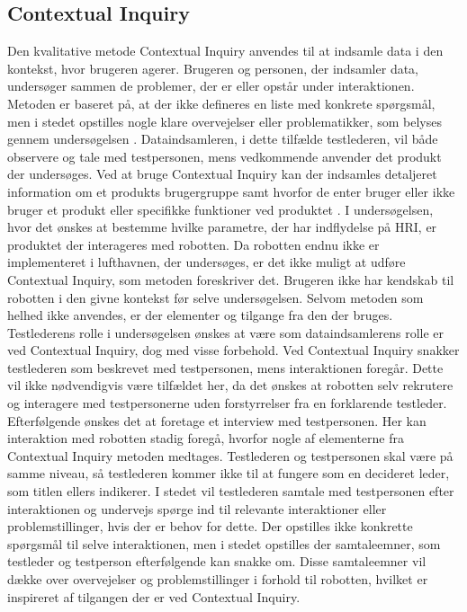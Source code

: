 \subsection{Contextual Inquiry}
\label{ParametreContextualInquiry}
%
Den kvalitative metode Contextual Inquiry anvendes til at indsamle data i den kontekst, hvor brugeren agerer. Brugeren og personen, der indsamler data, undersøger sammen de problemer, der er eller opstår under interaktionen. Metoden er baseret på, at der ikke defineres en liste med konkrete spørgsmål, men i stedet opstilles nogle klare overvejelser eller problematikker, som belyses gennem undersøgelsen \textcite[s. 1]{PDF:UsingCIToLearn}. Dataindsamleren, i dette tilfælde testlederen, vil både observere og tale med testpersonen, mens vedkommende anvender det produkt der undersøges. \blankline
%
Ved at bruge Contextual Inquiry kan der indsamles detaljeret information om et produkts brugergruppe samt hvorfor de enter bruger eller ikke bruger et produkt eller specifikke funktioner ved produktet \textcite[s. 2]{PDF:UsingCIToLearn}. \blankline
%
I undersøgelsen, hvor det ønskes at bestemme hvilke parametre, der har indflydelse på HRI, er produktet der interageres med robotten. Da robotten endnu ikke er implementeret i lufthavnen, der undersøges, er det ikke muligt at udføre Contextual Inquiry, som metoden foreskriver det. Brugeren ikke har kendskab til robotten i den givne kontekst før selve undersøgelsen. Selvom metoden som helhed ikke anvendes, er der elementer og tilgange fra den der bruges. \blankline
%
Testlederens rolle i undersøgelsen ønskes at være som dataindsamlerens rolle er ved Contextual Inquiry, dog med visse forbehold. Ved Contextual Inquiry snakker testlederen som beskrevet med testpersonen, mens interaktionen foregår. Dette vil ikke nødvendigvis være tilfældet her, da det ønskes at robotten selv rekrutere og interagere med testpersonerne uden forstyrrelser fra en forklarende testleder. Efterfølgende ønskes det at foretage et interview med testpersonen. Her kan interaktion med robotten stadig foregå, hvorfor nogle af elementerne fra Contextual Inquiry metoden medtages. Testlederen og testpersonen skal være på samme niveau, så testlederen kommer ikke til at fungere som en decideret leder, som titlen ellers indikerer. I stedet vil testlederen samtale med testpersonen efter interaktionen og undervejs spørge ind til relevante interaktioner eller problemstillinger, hvis der er behov for dette. Der opstilles ikke konkrette spørgsmål til selve interaktionen, men i stedet opstilles der samtaleemner, som testleder og testperson efterfølgende kan snakke om. Disse samtaleemner vil dække over overvejelser og problemstillinger i forhold til robotten, hvilket er inspireret af tilgangen der er ved Contextual Inquiry. \blankline
%
